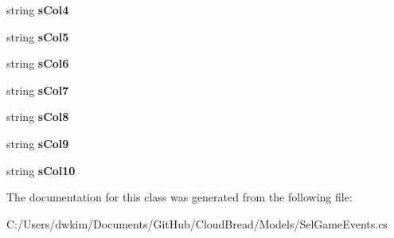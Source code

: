\begin{DoxyCompactItemize}
\item 
string {\bfseries s\+Col4}\hypertarget{a00087_a9747d278e52712f04e6be29a3c4fe4aa}{}\label{a00087_a9747d278e52712f04e6be29a3c4fe4aa}

\item 
string {\bfseries s\+Col5}\hypertarget{a00087_a436977d603cf3b721de4d5daecd66a23}{}\label{a00087_a436977d603cf3b721de4d5daecd66a23}

\item 
string {\bfseries s\+Col6}\hypertarget{a00087_a25dd7865a4ccc9ffd364fc2627a616b7}{}\label{a00087_a25dd7865a4ccc9ffd364fc2627a616b7}

\item 
string {\bfseries s\+Col7}\hypertarget{a00087_ac9b7c48583841ae687fe36ed117c928c}{}\label{a00087_ac9b7c48583841ae687fe36ed117c928c}

\item 
string {\bfseries s\+Col8}\hypertarget{a00087_aacd8b810d868a746e31e159f3d80da5e}{}\label{a00087_aacd8b810d868a746e31e159f3d80da5e}

\item 
string {\bfseries s\+Col9}\hypertarget{a00087_a3d72bd6a16420392c7bd72dacffd8296}{}\label{a00087_a3d72bd6a16420392c7bd72dacffd8296}

\item 
string {\bfseries s\+Col10}\hypertarget{a00087_a0faf37cac216d245ad68e278787c184f}{}\label{a00087_a0faf37cac216d245ad68e278787c184f}

\end{DoxyCompactItemize}


The documentation for this class was generated from the following file\+:\begin{DoxyCompactItemize}
\item 
C\+:/\+Users/dwkim/\+Documents/\+Git\+Hub/\+Cloud\+Bread/\+Models/Sel\+Game\+Events.\+cs\end{DoxyCompactItemize}
